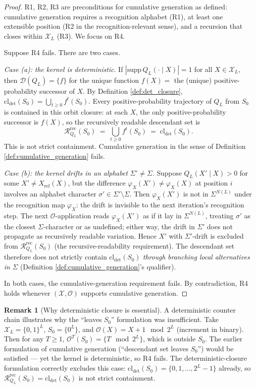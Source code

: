 \documentclass[11pt]{article}
\theoremstyle{plain}
\theoremstyle{definition}
\newtheorem{remark}[theorem]{Remark}
\newcommand{\descX}{\varphi_X}
\newcommand{\Xset}{\mathcal{X}}
\newcommand{\Op}{\mathcal{O}}
\newcommand{\Reach}{\mathcal{R}}
\begin{document}
\begin{proof}
R1, R2, R3 are preconditions for cumulative generation as defined: cumulative generation requires a recognition alphabet (R1), at least one extensible position (R2 in the recognition-relevant sense), and a recursion that closes within $\Xset_L$ (R3). We focus on R4.

Suppose R4 fails. There are two cases.

\emph{Case (a): the kernel is deterministic.} If $|\mathrm{supp}\, Q_L(\cdot \mid X)| = 1$ for all $X \in \Xset_L$, then $\mathcal{D}(Q_L) = \{f\}$ for the unique function $f(X) = $ the (unique) positive-probability successor of $X$. By Definition \ref{def:det_closure}, $\mathrm{cl}_{\det}(S_0) = \bigcup_{t \ge 0} f^t(S_0)$. Every positive-probability trajectory of $Q_L$ from $S_0$ is contained in this orbit closure: at each $X$, the only positive-probability successor is $f(X)$, so the recursively readable descendant set is
\[
\Reach_{Q_L}^{\mathrm{rec}}(S_0) \;=\; \bigcup_{t \ge 0} f^t(S_0) \;=\; \mathrm{cl}_{\det}(S_0).
\]
This is not strict containment. Cumulative generation in the sense of Definition \ref{def:cumulative_generation} fails.

\emph{Case (b): the kernel drifts in an alphabet $\Sigma' \ne \Sigma$.} Suppose $Q_L(X' \mid X) > 0$ for some $X' \ne X_{\mathrm{ref}}(X)$, but the difference $\descX(X') \ne \descX(X)$ at position $i$ involves an alphabet character $\sigma' \in \Sigma' \setminus \Sigma$. Then $\descX(X')$ is not in $\Sigma^{N(L)}$ under the recognition map $\descX$: the drift is invisible to the next iteration's recognition step. The next $\Op$-application reads $\descX(X')$ as if it lay in $\Sigma^{N(L)}$, treating $\sigma'$ as the closest $\Sigma$-character or as undefined; either way, the drift in $\Sigma'$ does not propagate as recursively readable variation. Hence $X'$ with $\Sigma'$-drift is excluded from $\Reach_{Q_L}^{\mathrm{rec}}(S_0)$ (the recursive-readability requirement). The descendant set therefore does not strictly contain $\mathrm{cl}_{\det}(S_0)$ \emph{through branching local alternatives in $\Sigma$} (Definition \ref{def:cumulative_generation}'s qualifier).

In both cases, the cumulative-generation requirement fails. By contradiction, R4 holds whenever $(\Xset, \Op)$ supports cumulative generation.
\end{proof}

\begin{remark}[Why deterministic closure is essential]
\label{rem:det_closure_essential}
A deterministic counter chain illustrates why the ``leaves $S_0$'' formulation was insufficient. Take $\Xset_L = \{0, 1\}^L$, $S_0 = \{0^L\}$, and $\Op(X) = X + 1 \mod 2^L$ (increment in binary). Then for any $T \ge 1$, $\Op^T(S_0) = \{T \mod 2^L\}$, which is outside $S_0$. The earlier formulation of cumulative generation (``descendant set leaves $S_0$'') would be satisfied --- yet the kernel is deterministic, so R4 fails. The deterministic-closure formulation correctly excludes this case: $\mathrm{cl}_{\det}(S_0) = \{0, 1, \ldots, 2^L - 1\}$ already, so $\Reach_{Q_L}^{\mathrm{rec}}(S_0) = \mathrm{cl}_{\det}(S_0)$ is not strict containment.
\end{remark}
\end{document}
